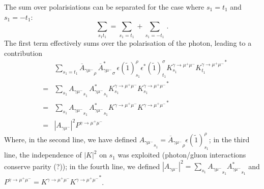 \documentclass[a4paper,10pt]{article}
\begin{document}
The sum over polarisiations can be separated for the case where $s_1 = t_1$ and  $s_1 =- t_1$:
\begin{equation}
 \sum_{s_1 t_1} =  \sum_{s_1= t_1} + \sum_{s_1=-t_1}\,.
\end{equation}
The first term effectively sums over the polarisation of the photon, leading to a contribution
\begin{eqnarray}
   && \sum_{s_1=t_1} {\overline A_{\gamma \mu^-} }_\rho\,  {\overline A^*_{\gamma \mu^-} }_\sigma 
    \, \epsilon(\tilde 1)^\rho_{s_1}  \epsilon^*(\tilde 1)^\sigma_{t_1} K^{\gamma\to\mu^+\mu^-}_{s_1} {K^{\gamma\to\mu^+\mu^-}_{t_1}}^*\\
    &=& \sum_{s_1}{A_{\gamma \mu^-} }_{s_1}\,  {A^*_{\gamma \mu^-} }_{s_1}  K^{\gamma\to\mu^+\mu^-}_{s_1}  {K^{\gamma\to\mu^+\mu^-}_{s_1}}^*\\
    &=&\sum_{s_1}{A_{\gamma \mu^-} }_{s_1}\,  {A^*_{\gamma \mu^-} }_{s_1}  K^{\gamma\to\mu^+\mu^-}  {K^{\gamma\to\mu^+\mu^-}}^*\\
    &=& |A_{\gamma \mu^-} |^2 P^{\gamma\to\mu^+\mu^-} 
\end{eqnarray}
Where, in the second line, we have defined ${A_{\gamma \mu^-} }_{s_1} = {\overline A_{\gamma \mu^-} }_\rho\epsilon(\tilde 1)^\rho_{s_1}$;
in the third line, the independence of $|K|^2$ on $s_1$ was exploited (photon/gluon interactions conserve parity (?));
in the fourth line, we defined $|A_{\gamma \mu^-} |^2=\sum_{s_1}{A_{\gamma \mu^-} }_{s_1} {A^*_{\gamma \mu^-} }_{s_1} $
and $  P^{\gamma\to\mu^+\mu^-} =  K^{\gamma\to\mu^+\mu^-}  {K^{\gamma\to\mu^+\mu^-}}^*$.
\end{document}
